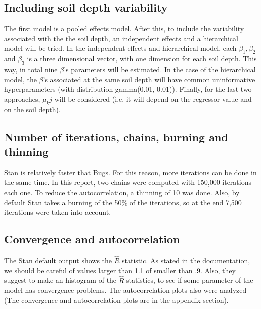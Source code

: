 \documentclass{article}
\begin{document}
\subsection*{Including soil depth variability}
The first model is a pooled effects model. After this, to include the variability associated with the the soil depth, an independent effects and a hierarchical model will be tried. In the independent effects and hierarchical model, each $\beta_1, \beta_2$ and $\beta_3$ is a three dimensional vector, with one dimension for each soil depth. This way, in total nine $\beta$'s parameters will be estimated. In the case of the hierarchical model, the $\beta$'s associated at the same soil depth will have common uninformative hyperparameters (with distribution gamma(0.01, 0.01)). Finally, for the last two approaches, $\mu_kj$ will be considered (i.e. it will depend on the regressor value and on the soil depth). 

\subsection*{Number of iterations, chains, burning and thinning}
Stan is relatively faster that Bugs. For this reason, more iterations can be done in the same time. In this report, two chains were computed with 150,000 iterations each one. To reduce the autocorrelation, a thinning of 10 was done. Also, by default Stan takes a burning of the 50\% of the iterations, so at the end 7,500 iterations were taken into account.

\subsection*{Convergence and autocorrelation}

The Stan default output shows the $\widehat{R}$ statistic. As stated in the documentation, we should be careful of values larger than 1.1 of smaller than .9. Also, they suggest to make an histogram of the $\widehat{R}$ statistics, to see if some parameter of the model has convergence problems. The autocorrelation plots also were analyzed (The convergence and autocorrelation plots are in the appendix section).

\newpage

\end{document}
